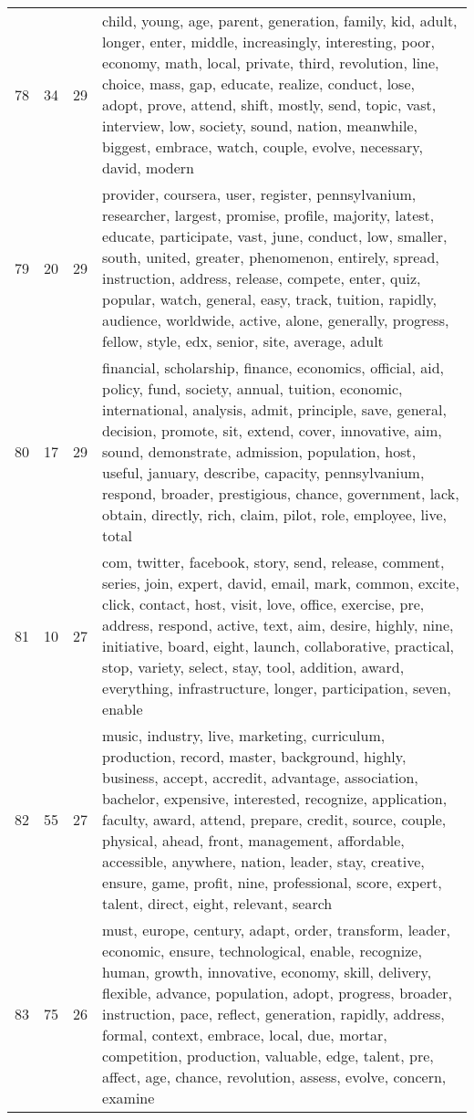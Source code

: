 \begin{table}[ht]
{\begin{tabularx}{\textwidth}{llrX}
   78 & 34 & 29 & child, young, age, parent, generation, family, kid, adult, longer, enter, middle, increasingly, interesting, poor, economy, math, local, private, third, revolution, line, choice, mass, gap, educate, realize, conduct, lose, adopt, prove, attend, shift, mostly, send, topic, vast, interview, low, society, sound, nation, meanwhile, biggest, embrace, watch, couple, evolve, necessary, david, modern \\ 
   79 & 20 & 29 & provider, coursera, user, register, pennsylvanium, researcher, largest, promise, profile, majority, latest, educate, participate, vast, june, conduct, low, smaller, south, united, greater, phenomenon, entirely, spread, instruction, address, release, compete, enter, quiz, popular, watch, general, easy, track, tuition, rapidly, audience, worldwide, active, alone, generally, progress, fellow, style, edx, senior, site, average, adult \\ 
   80 & 17 & 29 & financial, scholarship, finance, economics, official, aid, policy, fund, society, annual, tuition, economic, international, analysis, admit, principle, save, general, decision, promote, sit, extend, cover, innovative, aim, sound, demonstrate, admission, population, host, useful, january, describe, capacity, pennsylvanium, respond, broader, prestigious, chance, government, lack, obtain, directly, rich, claim, pilot, role, employee, live, total \\ 
   81 & 10 & 27 & com, twitter, facebook, story, send, release, comment, series, join, expert, david, email, mark, common, excite, click, contact, host, visit, love, office, exercise, pre, address, respond, active, text, aim, desire, highly, nine, initiative, board, eight, launch, collaborative, practical, stop, variety, select, stay, tool, addition, award, everything, infrastructure, longer, participation, seven, enable \\ 
   82 & 55 & 27 & music, industry, live, marketing, curriculum, production, record, master, background, highly, business, accept, accredit, advantage, association, bachelor, expensive, interested, recognize, application, faculty, award, attend, prepare, credit, source, couple, physical, ahead, front, management, affordable, accessible, anywhere, nation, leader, stay, creative, ensure, game, profit, nine, professional, score, expert, talent, direct, eight, relevant, search \\ 
   83 & 75 & 26 & must, europe, century, adapt, order, transform, leader, economic, ensure, technological, enable, recognize, human, growth, innovative, economy, skill, delivery, flexible, advance, population, adopt, progress, broader, instruction, pace, reflect, generation, rapidly, address, formal, context, embrace, local, due, mortar, competition, production, valuable, edge, talent, pre, affect, age, chance, revolution, assess, evolve, concern, examine \\ 

\end{tabularx}}
\end{table}
